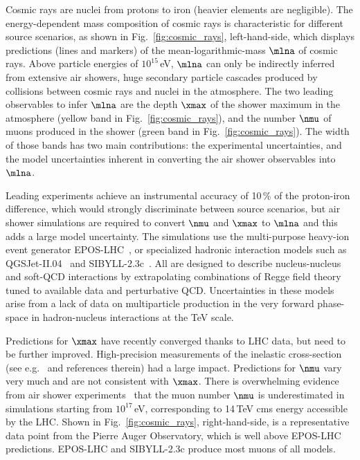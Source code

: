 \documentclass[../report.tex]{subfiles}
\begin{document}
Cosmic rays are nuclei from protons to iron (heavier elements are negligible). The energy-dependent mass composition of cosmic rays is characteristic for different source scenarios, as shown in Fig.~\ref{fig:cosmic_rays}, left-hand-side, which displays predictions (lines and markers) of the mean-logarithmic-mass $\mlna$ of cosmic rays. Above particle energies of $10^{15}$\,\si{eV}, $\mlna$ can only be indirectly inferred from extensive air showers, huge secondary particle cascades produced by collisions between cosmic rays and nuclei in the atmosphere. The two leading observables to infer $\mlna$ are the depth $\xmax$ of the shower maximum in the atmosphere (yellow band in Fig.~\ref{fig:cosmic_rays}), and the number $\nmu$ of muons produced in the shower (green band in Fig.~\ref{fig:cosmic_rays}). The width of those bands has two main contributions: the experimental uncertainties, and the model uncertainties inherent in converting the air shower observables into $\mlna$.

Leading experiments achieve an instrumental accuracy of 10\,\% of the proton-iron difference, which would strongly discriminate between source scenarios, but air shower simulations are required to convert $\nmu$ and $\xmax$ to $\mlna$ and this adds a large model uncertainty. The simulations use the multi-purpose heavy-ion event generator EPOS-LHC~\cite{Werner:2005jf}, or specialized hadronic interaction models such as \mbox{QGSJet-II.04}~\cite{Ostapchenko:2010vb} and SIBYLL-2.3c~\cite{Riehn:2017mfm}. All are designed to describe nucleus-nucleus and soft-QCD interactions by extrapolating combinations of Regge field theory tuned to available data and perturbative QCD. Uncertainties in these models arise from a lack of data on multiparticle production in the very forward phase-space in hadron-nucleus interactions at the TeV scale.

Predictions for $\xmax$ have recently converged thanks to LHC data, but need to be further improved. High-precision measurements of the inelastic cross-section (see e.g.~\cite{Aaij:2018okq} and references therein) had a large impact. Predictions for $\nmu$ vary very much and are not consistent with $\xmax$. There is overwhelming evidence from air shower experiments~\cite{Dembinski:2018UHECR,Aab:2014pza,Dembinski:2017zkb,Kokoulin:2009zz,Abbasi:2018fkz} that the muon number $\nmu$ is underestimated in simulations starting from $10^{17}$\,eV, corresponding to 14\,TeV cms energy accessible by the LHC. Shown in Fig.~\ref{fig:cosmic_rays}, right-hand-side, is a representative data point from the Pierre Auger Observatory, which is well above EPOS-LHC predictions. EPOS-LHC and SIBYLL-2.3c produce most muons of all models.
\end{document}
